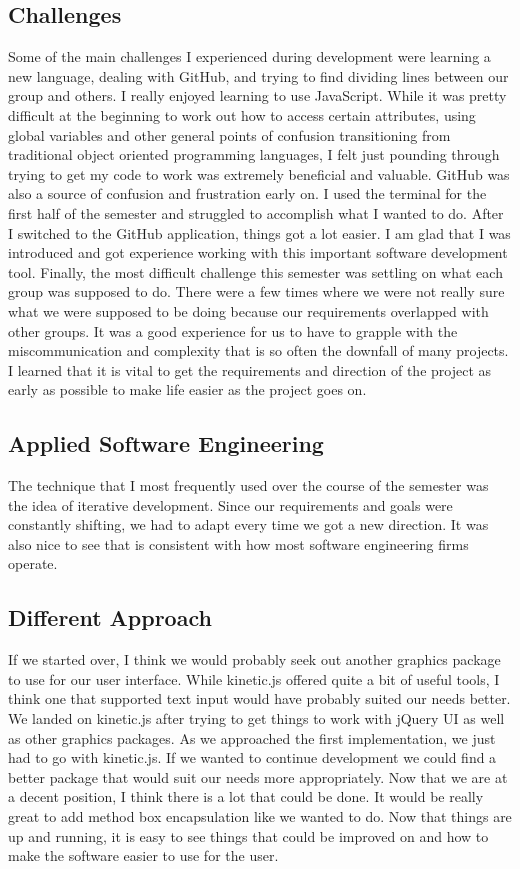 \documentclass[a4paper]{article}
\begin{document}
\subsection{Challenges}
Some of the main challenges I experienced during development were learning a new language, dealing with GitHub, and trying to find dividing lines between our group and others. I really enjoyed learning to use JavaScript. While it was pretty difficult at the beginning to work out how to access certain attributes, using global variables and other general points of confusion transitioning from traditional object oriented programming languages, I felt just pounding through trying to get my code to work was extremely beneficial and valuable. GitHub was also a source of confusion and frustration early on. I used the terminal for the first half of the semester and struggled to accomplish what I wanted to do. After I switched to the GitHub application, things got a lot easier. I am glad that I was introduced and got experience working with this important software development tool. Finally, the most difficult challenge this semester was settling on what each group was supposed to do. There were a few times where we were not really sure what we were supposed to be doing because our requirements overlapped with other groups. It was a good experience for us to have to grapple with the miscommunication and complexity that is so often the downfall of many projects. I learned that it is vital to get the requirements and direction of the project as early as possible to make life easier as the project goes on. 


\subsection{Applied Software Engineering}
The technique that I most frequently used over the course of the semester was the idea of iterative development. Since our requirements and goals were constantly shifting, we had to adapt every time we got a new direction. It was also nice to see that is consistent with how most software engineering firms operate.   

\subsection{Different Approach}
If we started over, I think we would probably seek out another graphics package to use for our user interface. While kinetic.js offered quite a bit of useful tools, I think one that supported text input would have probably suited our needs better. We landed on kinetic.js after trying to get things to work with jQuery UI as well as other graphics packages. As we approached the first implementation, we just had to go with kinetic.js. If we wanted to continue development we could find a better package that would suit our needs more appropriately. Now that we are at a decent position, I think there is a lot that could be done. It would be really great to add method box encapsulation like we wanted to do. Now that things are up and running, it is easy to see things that could be improved on and how to make the software easier to use for the user. 
\end{document}
